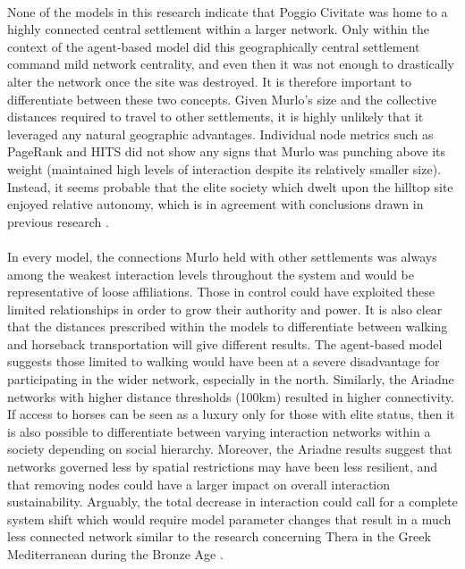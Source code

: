 \documentclass[12pt,a4paper]{thesis}
\begin{document}
\paragraph{}
None of the models in this research indicate that Poggio Civitate was home to a highly connected central settlement within a larger network. Only within the context of the agent-based model did this geographically central settlement command mild network centrality, and even then it was not enough to drastically alter the network once the site was destroyed. It is therefore important to differentiate between these two concepts. Given Murlo's size and the collective distances required to travel to other settlements, it is highly unlikely that it leveraged any natural geographic advantages. Individual node metrics such as PageRank and HITS did not show any signs that Murlo was punching above its weight (maintained high levels of interaction despite its relatively smaller size). Instead, it seems probable that the elite society which dwelt upon the hilltop site enjoyed relative autonomy, which is in agreement with conclusions drawn in previous research \citep{StoRed11}.
 
\paragraph{}
In every model, the connections Murlo held with other settlements was always among the weakest interaction levels throughout the system and would be representative of loose affiliations. Those in control could have exploited these limited relationships in order to grow their authority and power. It is also clear that the distances prescribed within the models to differentiate between walking and horseback transportation will give different results. The agent-based model suggests those limited to walking would have been at a severe disadvantage for participating in the wider network, especially in the north. Similarly, the Ariadne networks with higher distance thresholds (100km) resulted in higher connectivity. If access to horses can be seen as a luxury only for those with elite status, then it is also possible to differentiate between varying interaction networks within a society depending on social hierarchy. Moreover, the Ariadne results suggest that networks governed less by spatial restrictions may have been less resilient, and that removing nodes could have a larger impact on overall interaction sustainability. Arguably, the total decrease in interaction could call for a complete system shift which would require model parameter changes that result in a much less connected network similar to the research concerning Thera in the Greek Mediterranean during the Bronze Age \citep{KnaRivEva11}.      
\end{document}
